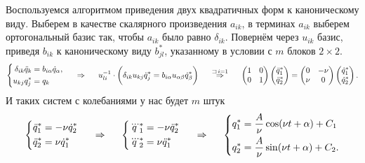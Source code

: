 Воспользуемся алгоритмом приведения двух квадратичных форм к каноническому виду. Выберем в качестве скалярного произведения $a_{ik}$, в терминах $a_{ik}$ выберем ортогональный базис так, чтобы $a_{ik}$ было равно $\delta_{ik}.$ Повернём через $u_{ik}$ базис, приведя $b_{ik}$ к каноническому виду $b^*_{jl}$, указанному в условии с $m$ блоков $2 \times 2$. 
\begin{equation*}
    \left\{\begin{aligned}
        \delta_{ik} \ddot{q}_k &= b_{i\alpha} \dot{q}_\alpha, \\    
        u_{kj} q^*_j &= q_k
    \end{aligned}\right.
    \hspace{0.5cm} \Rightarrow  \hspace{0.5cm}
    u^{-1}_{li} \cdot \left(\vphantom{\frac{1}{2}}
        \delta_{ik} u_{kj} \ddot{q}^*_j= b_{i\alpha} u_{\alpha \beta} \dot{q}^*_\beta
    \right)
    \hspace{0.5cm} \overset{\sqsupset\, i = 1}{\Rightarrow}  \hspace{0.5cm}
    \begin{pmatrix}
        1 & 0 \\
        0 & 1 \\
    \end{pmatrix} 
    \begin{pmatrix}
        \ddot{q}_1^* \\ \ddot{q}_2^*
    \end{pmatrix} = 
    \begin{pmatrix}
        0 & -\nu \\
        \nu & 0 \\
    \end{pmatrix}
    \begin{pmatrix}
        \dot{q}_1^* \\ \dot{q}_2^*
    \end{pmatrix}.
\end{equation*}
И таких систем с колебаниями у нас будет $m$ штук
\begin{equation*}
    \left\{\begin{aligned}
        \ddot{q}_1^* &= - \nu \dot{q}_2^* \\
        \ddot{q}_2^* &= \nu \dot{q}_1^* \\
    \end{aligned}\right.
    \hspace{0.5cm} \Rightarrow \hspace{0.5cm}
    \left\{\begin{aligned}
        \dddot{q}_1^* &= - \nu \ddot{q}_2^* \\
        \dddot{q}_2^* &=  \nu \ddot{q}_1^* \\
    \end{aligned}\right.
    \hspace{0.5cm} \Rightarrow \hspace{0.5cm}
    \left\{\begin{aligned}
        q_1^* &= \frac{A}{\nu} \cos (\nu t + \alpha) + C_1 \\
        q_2^* &= \frac{A}{\nu} \sin (\nu t + \alpha) + C_2. \\
    \end{aligned}\right.
\end{equation*}
